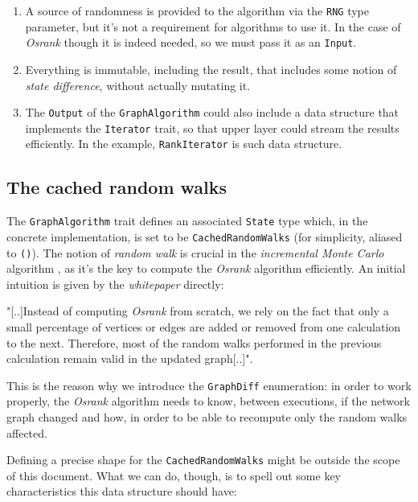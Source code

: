 \documentclass{article}
\begin{document}
\begin{enumerate}
\item A source of randomness is provided to the algorithm via
      the \texttt{RNG} type parameter, but it's not a
      requirement for algorithms to use it. In the case of
      \textit{Osrank} though it is indeed needed, so we must
      pass it as an \texttt{Input}.
\item Everything is immutable, including the result, that
      includes some notion of \textit{state difference},
      without actually mutating it.
\item The \texttt{Output} of the \texttt{GraphAlgorithm} could
      also include a data structure that implements the
      \texttt{Iterator} trait, so that upper layer could stream
      the results efficiently. In the example, \texttt{RankIterator}
      is such data structure.
\end{enumerate}

\subsection{The cached random walks}

The \texttt{GraphAlgorithm} trait defines an associated
\texttt{State} type which, in the concrete implementation, is
set to be \texttt{CachedRandomWalks} (for simplicity, aliased
to \texttt{()}). The notion of \textit{random walk} is crucial
in the \textit{incremental Monte Carlo} algorithm
\citep{bahmani10pagerank}, as it's the key to compute the
\textit{Osrank} algorithm efficiently. An initial intuition is
given by the \textit{whitepaper} \citep{opensourcecoin2019}
directly:

"[..]Instead of computing \textit{Osrank} from scratch, we rely
on the fact that only a small percentage of vertices or edges
are added or removed from one calculation to the next. Therefore,
most of the random walks performed in the previous calculation
remain valid in the updated graph[..]".

This is the reason why we introduce the \texttt{GraphDiff}
enumeration: in order to work properly, the \textit{Osrank}
algorithm needs to know, between executions, if the network
graph changed and how, in order to be able to recompute only
the random walks affected.

Defining a precise shape for the \texttt{CachedRandomWalks} might
be outside the scope of this document. What we can do, though, is
to spell out some key characteristics this data structure should
have:
\end{document}
